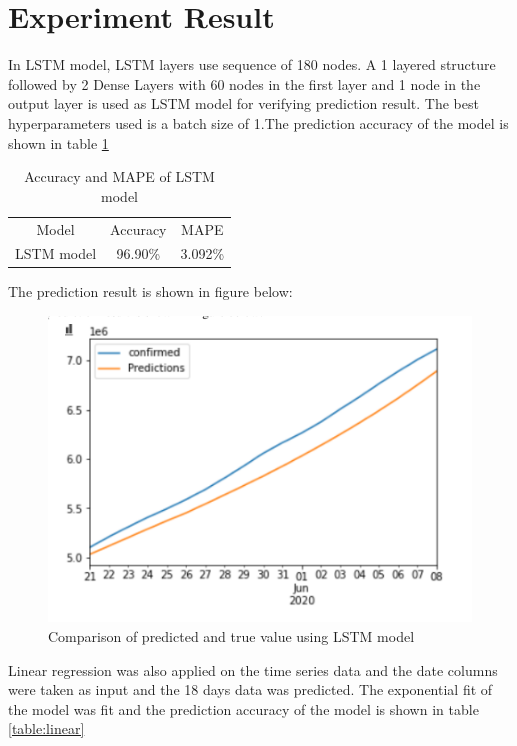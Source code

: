 \newpage

\section{Experiment Result}

In LSTM model, LSTM layers use sequence of 180 nodes. A 1 layered structure followed by
2 Dense Layers with 60 nodes in the first layer and 1 node in the output layer is used as LSTM model for verifying prediction result. The best
hyperparameters used is a batch size of 1.The prediction accuracy of the model
is shown in table \ref{table:lstm}

\begin{table}[ht!]
	\centering
	\caption{Accuracy and MAPE of LSTM model}
	\begin{tabular}{c c c}
		Model & Accuracy & MAPE \\
		LSTM model & 96.90\% & 3.092\%
	\end{tabular}
	\label{table:lstm}
\end{table}

The prediction result is shown in figure below:
\begin{figure}[ht!]
	\centering
	\includegraphics[scale=0.5]{images/lstm_graph.png}
	\caption{Comparison of predicted and true value using LSTM model}
	\label{fig:lstm_graph}
\end{figure}

Linear regression was also applied on the time series data and the date columns were taken
as input and the 18 days data was predicted. The exponential fit of the model
was fit and the prediction accuracy of the model is shown in table
\ref{table:linear}

